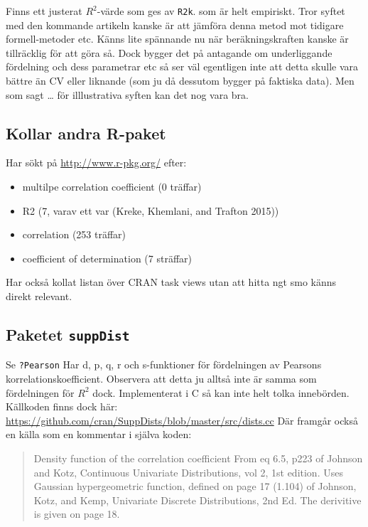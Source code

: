 \documentclass[]{article}
\providecommand{\tightlist}{%
  \setlength{\itemsep}{0pt}\setlength{\parskip}{0pt}}
\begin{document}
Finns ett justerat \(R^2\)-värde som ges av \texttt{R2k}. som är helt
empiriskt. Tror syftet med den kommande artikeln kanske är att jämföra
denna metod mot tidigare formell-metoder etc. Känns lite spännande nu
när beräkningskraften kanske är tillräcklig för att göra så. Dock bygger
det på antagande om underliggande fördelning och dess parametrar etc så
ser väl egentligen inte att detta skulle vara bättre än CV eller
liknande (som ju då dessutom bygger på faktiska data). Men som sagt
\ldots{} för illlustrativa syften kan det nog vara bra.

\subsection{Kollar andra R-paket}\label{kollar-andra-r-paket}

Har sökt på \url{http://www.r-pkg.org/} efter:

\begin{itemize}
\tightlist
\item
  multilpe correlation coefficient (0 träffar)
\item
  R2 (7, varav ett var (Kreke, Khemlani, and Trafton 2015))
\item
  correlation (253 träffar)
\item
  coefficient of determination (7 sträffar)
\end{itemize}

Har också kollat listan över CRAN task views utan att hitta ngt smo
känns direkt relevant.

\subsection{\texorpdfstring{Paketet
\texttt{suppDist}}{Paketet suppDist}}\label{paketet-suppdist}

Se \texttt{?Pearson} Har d, p, q, r och s-funktioner för fördelningen av
Pearsons korrelationskoefficient. Observera att detta ju alltså inte är
samma som fördelningen för \(R^2\) dock. Implementerat i C så kan inte
helt tolka innebörden. Källkoden finns dock här:
\url{https://github.com/cran/SuppDists/blob/master/src/dists.cc} Där
framgår också en källa som en kommentar i själva koden:

\begin{quote}
Density function of the correlation coefficient From eq 6.5, p223 of
Johnson and Kotz, Continuous Univariate Distributions, vol 2, 1st
edition. Uses Gaussian hypergeometric function, defined on page 17
(1.104) of Johnson, Kotz, and Kemp, Univariate Discrete Distributions,
2nd Ed. The derivitive is given on page 18.
\end{quote}
\end{document}
